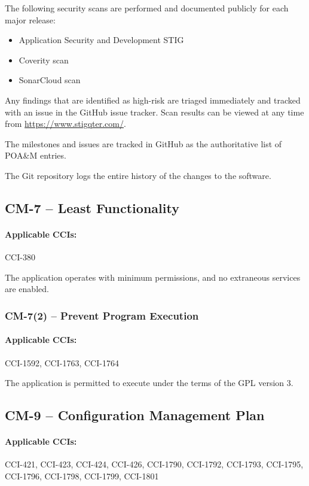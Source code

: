 \documentclass[letterpaper, 10pt, twoside]{article}
\begin{document}
The following security scans are performed and documented publicly for each major release:
\begin{itemize}
	\item Application Security and Development STIG
	\item Coverity scan
	\item SonarCloud scan
\end{itemize}

Any findings that are identified as high-risk are triaged immediately and tracked with an issue in the GitHub issue tracker. Scan results can be viewed at any time from \url{https://www.stigqter.com/}.

The milestones and issues are tracked in GitHub as the authoritative list of POA\&M entries.

The Git repository logs the entire history of the changes to the software.

\subsection{CM-7 -- Least Functionality}

\paragraph{Applicable CCIs:} CCI-380

The application operates with minimum permissions, and no extraneous services are enabled.

\subsubsection{CM-7(2) -- Prevent Program Execution}

\paragraph{Applicable CCIs:} CCI-1592, CCI-1763, CCI-1764

The application is permitted to execute under the terms of the GPL version 3.

\subsection{CM-9 -- Configuration Management Plan}

\paragraph{Applicable CCIs:} CCI-421, CCI-423, CCI-424, CCI-426, CCI-1790, CCI-1792, CCI-1793, CCI-1795, CCI-1796, CCI-1798, CCI-1799, CCI-1801
\end{document}

